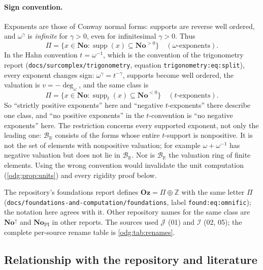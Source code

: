 \documentclass[11pt,oneside]{article}
\numberwithin{equation}{section}
\theoremstyle{definition}
\theoremstyle{remark}
\newcommand{\No}{\mathbf{No}}
\newcommand{\Oz}{\mathbf{Oz}}
\newcommand{\Z}{\mathbb Z}
\newcommand{\R}{\mathbb R}
\newcommand{\BR}{\mathcal B_{\R}}
\newcommand{\supp}{\operatorname{supp}}
\newcommand{\ddeg}{\operatorname{deg}_{\omega}}
\newcommand{\replabel}[1]{\nolinkurl{#1}}
\newcommand{\fn}[1]{\nolinkurl{#1}}
\begin{document}
\paragraph{Sign convention.}
Exponents are those of Conway normal forms: supports are reverse well
ordered, and $\omega^\gamma$ is \emph{infinite} for $\gamma>0$, even for
infinitesimal $\gamma>0$. Thus
\[
 \Pi=\{x\in\No:\supp(x)\subseteq\No^{>0}\}\quad(\text{$\omega$-exponents}).
\]
In the Hahn convention $t=\omega^{-1}$, which is the convention of the
trigonometry report (\fn{docs/surcomplex/trigonometry},
equation \replabel{trigonometry:eq:split}), every exponent changes sign:
$\omega^\gamma=t^{-\gamma}$, supports become well ordered, the valuation is
$v=-\ddeg$, and the same class is
\[
 \Pi=\{x\in\No:\supp_t(x)\subseteq\No^{<0}\}\quad(\text{$t$-exponents}).
\]
So ``strictly positive exponents'' here and ``negative $t$-exponents'' there
describe one class, and ``no positive exponents'' in the $t$-convention is
``no negative exponents'' here. The restriction concerns every supported exponent, not only the leading
one: $\BR$ consists of the forms whose entire $t$-support is nonpositive.
It is not the set of elements with nonpositive valuation; for example
$\omega+\omega^{-1}$ has negative valuation but does not lie in $\BR$.
Nor is $\BR$ the valuation ring of finite elements.
Using the wrong convention would invalidate the unit computation
(\cref{odg:prop:units}) and every rigidity proof below.

The repository's foundations report defines $\Oz=\Pi\oplus\Z$ with the same
letter $\Pi$ (\fn{docs/foundations-and-computation/foundations}, label
\replabel{found:eq:omnific}); the notation here agrees with it. Other
repository names for the same class are $\No^{\uparrow}$ and
$\No_{\mathrm{PI}}$ in other reports. The sources used $\mathcal J$ (01) and
$\mathcal I$ (02, 05); the complete per-source rename table is
\cref{odg:tab:renames}.

\subsection{Relationship with the repository and literature}\label{odg:sub:repo}
\end{document}
